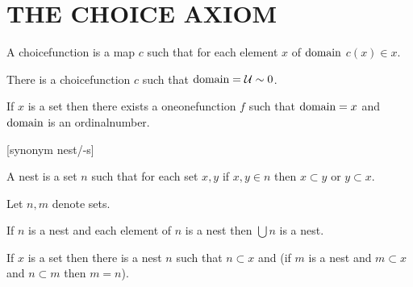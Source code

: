\documentclass[a4paper,draft]{amsproc}
\begin{document}
\section{THE CHOICE AXIOM}
\begin{forthel}

\begin{definition}
A choicefunction is a map $c$ such that for each element $x$ of $\domain c$ $c(x) \in x$.
\end{definition}

\begin{axiom}[IX]
There is a choicefunction $c$ such that $\domain c = \cal{U} \sim 0$.
\end{axiom}

\begin{theorem}[140]
If $x$ is a set then there exists a oneonefunction $f$ such that $\domain f = x$ and $\domain f$ is an ordinalnumber.
\end{theorem}

[synonym nest/-s]
\begin{definition}[141]
A nest is a set $n$ such that for each set $x, y$ if $x, y \in n$ then $x \subset y$ or $y \subset x$.
\end{definition}

Let $n, m$ denote sets.
\begin{theorem}[142]
If $n$ is a nest and each element of $n$ is a nest then $\bigcup n$ is a nest.
\end{theorem}

\begin{theorem}[143]
If $x$ is a set then there is a nest $n$ such that $n \subset x$ and (if $m$ is a nest and $m \subset x$ and $n \subset m$ then $m = n$).
\end{theorem}

\end{forthel}
\end{document}
